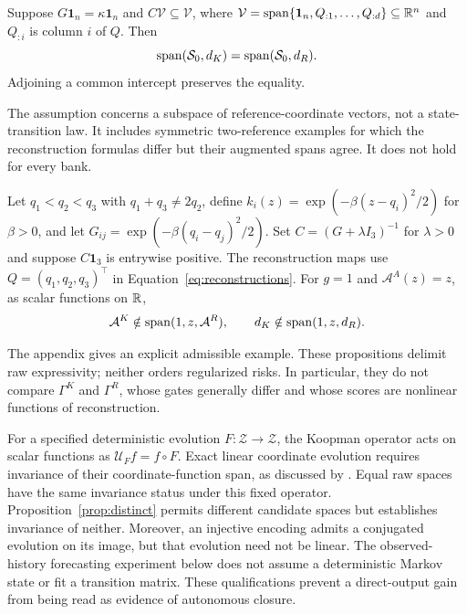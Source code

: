 \begin{proposition}\label{prop:equal}
Suppose $G\mathbf1_n=\kappa\mathbf1_n$ and $C\mathcal V\subseteq\mathcal V$, where $\mathcal V=\operatorname{span}\{\mathbf1_n,Q_{:1},\ldots,Q_{:d}\}\subseteq\mathbb R^n$ and $Q_{:i}$ is column $i$ of $Q$. Then
\[
 \operatorname{span}(\mathcal S_0,d_K)=\operatorname{span}(\mathcal S_0,d_R).
\]
Adjoining a common intercept preserves the equality.
\end{proposition}
The assumption concerns a subspace of reference-coordinate vectors, not a state-transition law. It includes symmetric two-reference examples for which the reconstruction formulas differ but their augmented spans agree. It does not hold for every bank.

\begin{proposition}\label{prop:distinct}
Let $q_1<q_2<q_3$ with $q_1+q_3\ne2q_2$, define $k_i(z)=\exp(-\beta(z-q_i)^2/2)$ for $\beta>0$, and let $G_{ij}=\exp(-\beta(q_i-q_j)^2/2)$. Set $C=(G+\lambda I_3)^{-1}$ for $\lambda>0$ and suppose $C\mathbf1_3$ is entrywise positive. The reconstruction maps use $Q=(q_1,q_2,q_3)^\top$ in Equation~\eqref{eq:reconstructions}. For $g=1$ and $\mathcal A^A(z)=z$, as scalar functions on $\mathbb R$,
\[
 \mathcal A^K\notin\operatorname{span}(1,z,\mathcal A^R),\qquad
 d_K\notin\operatorname{span}(1,z,d_R).
\]
\end{proposition}
The appendix gives an explicit admissible example. These propositions delimit raw expressivity; neither orders regularized risks. In particular, they do not compare $\Gamma^K$ and $\Gamma^R$, whose gates generally differ and whose scores are nonlinear functions of reconstruction.

For a specified deterministic evolution $F:\mathcal Z\to\mathcal Z$, the Koopman operator acts on scalar functions as $\mathcal U_F f=f\circ F$. Exact linear coordinate evolution requires invariance of their coordinate-function span, as discussed by \citet{KumarKargaran2026Limits}. Equal raw spaces have the same invariance status under this fixed operator. Proposition~\ref{prop:distinct} permits different candidate spaces but establishes invariance of neither. Moreover, an injective encoding admits a conjugated evolution on its image, but that evolution need not be linear. The observed-history forecasting experiment below does not assume a deterministic Markov state or fit a transition matrix. These qualifications prevent a direct-output gain from being read as evidence of autonomous closure.
